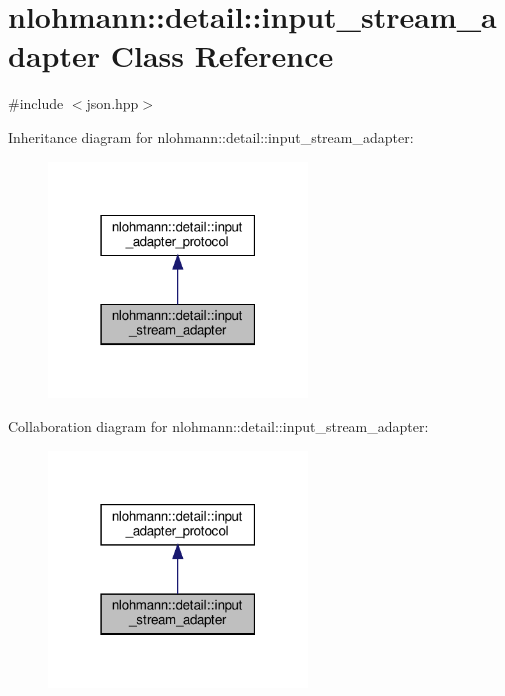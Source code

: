 \hypertarget{classnlohmann_1_1detail_1_1input__stream__adapter}{}\section{nlohmann\+:\+:detail\+:\+:input\+\_\+stream\+\_\+adapter Class Reference}
\label{classnlohmann_1_1detail_1_1input__stream__adapter}


{\ttfamily \#include $<$json.\+hpp$>$}



Inheritance diagram for nlohmann\+:\+:detail\+:\+:input\+\_\+stream\+\_\+adapter\+:
\nopagebreak
\begin{figure}[H]
\begin{center}
\leavevmode
\includegraphics[width=195pt]{classnlohmann_1_1detail_1_1input__stream__adapter__inherit__graph}
\end{center}
\end{figure}


Collaboration diagram for nlohmann\+:\+:detail\+:\+:input\+\_\+stream\+\_\+adapter\+:
\nopagebreak
\begin{figure}[H]
\begin{center}
\leavevmode
\includegraphics[width=195pt]{classnlohmann_1_1detail_1_1input__stream__adapter__coll__graph}
\end{center}
\end{figure}
